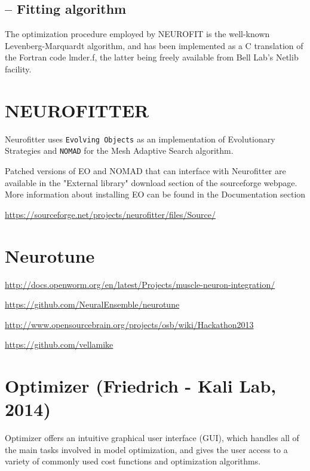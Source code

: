 \subsection{-- Fitting algorithm}

The optimization procedure employed by NEUROFIT is the well-known
Levenberg-Marquardt algorithm, and has been implemented as a C translation of
the Fortran code lmder.f, the latter being freely available from Bell Lab's
Netlib facility.

\section{NEUROFITTER}
\label{sec:NEUROFITTER}

Neurofitter uses \verb!Evolving Objects! as an implementation of Evolutionary
Strategies and \verb!NOMAD! for the Mesh Adaptive Search algorithm. 

Patched versions of EO and NOMAD that can interface with Neurofitter are
available in the "External library" download section of the sourceforge webpage.
More information about installing EO can be found in the Documentation section

\url{https://sourceforge.net/projects/neurofitter/files/Source/}

\section{Neurotune}
\label{sec:Neurotune}

\url{http://docs.openworm.org/en/latest/Projects/muscle-neuron-integration/}

\url{https://github.com/NeuralEnsemble/neurotune}

\url{http://www.opensourcebrain.org/projects/osb/wiki/Hackathon2013}

\url{https://github.com/vellamike}


\section{Optimizer (Friedrich - Kali Lab, 2014)}

Optimizer offers an intuitive graphical user interface (GUI), which handles
all of the main tasks involved in model optimization, and gives the user
access to a variety of commonly used cost functions and optimization algorithms.




